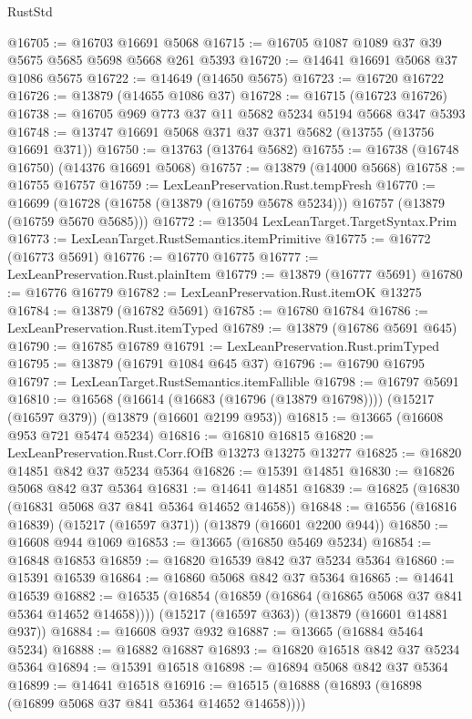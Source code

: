 \begin{lexlean}{RustStd}
\begin{coremodule}
@16705 := @16703 @16691 @5068
@16715 := @16705 @1087 @1089 @37 @39 @5675 @5685 @5698 @5668 @261 @5393
@16720 := @14641 @16691 @5068 @37 @1086 @5675
@16722 := @14649 (@14650 @5675)
@16723 := @16720 @16722
@16726 := @13879 (@14655 @1086 @37)
@16728 := @16715 (@16723 @16726)
@16738 := @16705 @969 @773 @37 @11 @5682 @5234 @5194 @5668 @347 @5393
@16748 := @13747 @16691 @5068 @371 @37 @371 @5682 (@13755 (@13756 @16691 @371))
@16750 := @13763 (@13764 @5682)
@16755 := @16738 (@16748 @16750) (@14376 @16691 @5068)
@16757 := @13879 (@14000 @5668)
@16758 := @16755 @16757
@16759 := LexLeanPreservation.Rust.tempFresh
@16770 := @16699
    (@16728 (@16758 (@13879 (@16759 @5678 @5234))) @16757 (@13879 (@16759 @5670 @5685)))
@16772 := @13504 LexLeanTarget.TargetSyntax.Prim
@16773 := LexLeanTarget.RustSemantics.itemPrimitive
@16775 := @16772 (@16773 @5691)
@16776 := @16770 @16775
@16777 := LexLeanPreservation.Rust.plainItem
@16779 := @13879 (@16777 @5691)
@16780 := @16776 @16779
@16782 := LexLeanPreservation.Rust.itemOK @13275
@16784 := @13879 (@16782 @5691)
@16785 := @16780 @16784
@16786 := LexLeanPreservation.Rust.itemTyped
@16789 := @13879 (@16786 @5691 @645)
@16790 := @16785 @16789
@16791 := LexLeanPreservation.Rust.primTyped
@16795 := @13879 (@16791 @1084 @645 @37)
@16796 := @16790 @16795
@16797 := LexLeanTarget.RustSemantics.itemFallible
@16798 := @16797 @5691
@16810 := @16568
    (@16614 (@16683 (@16796 (@13879 @16798))))
    (@15217 (@16597 @379))
    (@13879 (@16601 @2199 @953))
@16815 := @13665 (@16608 @953 @721 @5474 @5234)
@16816 := @16810 @16815
@16820 := LexLeanPreservation.Rust.Corr.fOfB @13273 @13275 @13277
@16825 := @16820 @14851 @842 @37 @5234 @5364
@16826 := @15391 @14851
@16830 := @16826 @5068 @842 @37 @5364
@16831 := @14641 @14851
@16839 := @16825 (@16830 (@16831 @5068 @37 @841 @5364 @14652 @14658))
@16848 := @16556 (@16816 @16839) (@15217 (@16597 @371)) (@13879 (@16601 @2200 @944))
@16850 := @16608 @944 @1069
@16853 := @13665 (@16850 @5469 @5234)
@16854 := @16848 @16853
@16859 := @16820 @16539 @842 @37 @5234 @5364
@16860 := @15391 @16539
@16864 := @16860 @5068 @842 @37 @5364
@16865 := @14641 @16539
@16882 := @16535
    (@16854 (@16859 (@16864 (@16865 @5068 @37 @841 @5364 @14652 @14658))))
    (@15217 (@16597 @363))
    (@13879 (@16601 @14881 @937))
@16884 := @16608 @937 @932
@16887 := @13665 (@16884 @5464 @5234)
@16888 := @16882 @16887
@16893 := @16820 @16518 @842 @37 @5234 @5364
@16894 := @15391 @16518
@16898 := @16894 @5068 @842 @37 @5364
@16899 := @14641 @16518
@16916 := @16515
    (@16888 (@16893 (@16898 (@16899 @5068 @37 @841 @5364 @14652 @14658))))

\end{coremodule}
\end{lexlean}
